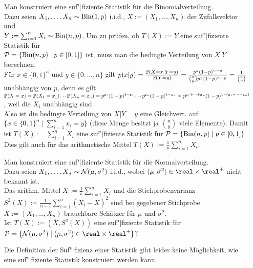 \begin{Bsp}
    Man konstruiert eine suf"|fiziente Statistik für die Binomialverteilung.\\
    Dazu seien $X_1, \dotsc, X_n \sim \operatorname{Bin}(1, p)$ i.i.d.,
    $X := (X_1, \dotsc, X_n)$ der Zufallsvektor und\\
    $Y := \sum_{i=1}^n X_i \sim \operatorname{Bin}(n, p)$.
    Um zu prüfen, ob $T(X) := Y$ eine suf"|fiziente Statistik für\\
    $\mathcal{P} = \{\operatorname{Bin}(n, p) \;|\; p \in [0, 1]\}$ ist, muss man die bedingte Verteilung von $X|Y$
    berechnen.\\
    Für $x \in \{0, 1\}^n$ und $y \in \{0, \dotsc, n\}$ gilt
    $p(x|y) = \frac{\mathbb{P}(X = x, Y = y)}{\mathbb{P}(Y = y)} =
    \frac{p^y (1-p)^{n-y}}{\binom{n}{y} p^y (1-p)^{n-y}} = \frac{1}{\binom{n}{y}}$
    unabhängig von $p$,
    denn es gilt $\mathbb{P}(X = x) = \mathbb{P}(X_1 = x_1) \dotsm \mathbb{P}(X_n = x_n) =
    p^{x_1} (1-p)^{1-x_1} \dotsm p^{x_n} (1-p)^{1-x_n} =
    p^{x_1+\dotsb+x_n} (1-p)^{1-(x_1+\dotsb+x_n)}$, weil die $X_i$ unabhängig sind.\\
    Also ist die bedingte Verteilung von $X|Y = y$ eine Gleichvert. auf
    $\{x \in \{0, 1\}^n \;|\; \sum_{i=1}^n x_i = y\}$
    (diese Menge besitzt ja $\binom{n}{y}$ viele Elemente).
    Damit ist $T(X) := \sum_{i=1}^n X_i$ eine suf"|fiziente Statistik für
    $\mathcal{P} = \{\operatorname{Bin}(n, p) \;|\; p \in [0, 1]\}$.
    Dies gilt auch für das arithmetische Mittel $T(X) := \frac{1}{n} \sum_{i=1}^n X_i$.
\end{Bsp}

\begin{Bsp}
    Man konstruiert eine suf"|fiziente Statistik für die Normalverteilung.\\
    Dazu seien $X_1, \dotsc, X_n \sim \mathcal{N}(\mu, \sigma^2)$ i.i.d.,
    wobei $(\mu, \sigma^2) \in \real \times \real^+$ nicht bekannt ist.\\
    Das arithm. Mittel $\overline{X} := \frac{1}{n} \sum_{i=1}^n X_i$ und die
    Stichprobenvarianz $S^2(X) := \frac{1}{n-1} \sum_{i=1}^n (X_i - \overline{X})^2$ sind
    bei gegebener Stichprobe $X := (X_1, \dotsc, X_n)$
    brauchbare Schätzer für $\mu$ und $\sigma^2$.\\
    Ist $T(X) := (\overline{X}, S^2(X))$ eine suf"|fiziente Statistik für
    $\P = \{\N(\mu, \sigma^2) \;|\; (\mu, \sigma^2) \in \real \times \real^+\}$?
\end{Bsp}

\linie

\begin{Bem}
    Die Definition der Suf"|fizienz einer Statistik gibt leider keine Möglichkeit,
    wie eine suf"|fiziente Statistik konstruiert werden kann.
\end{Bem}

